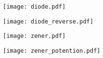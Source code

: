 \documentclass[11pt,dvipdfmx]{jarticle}
\begin{document}
\begin{figure}
  \centering
  \texttt{[image: diode.pdf]}
\end{figure}

\begin{figure}
  \centering
  \texttt{[image: diode\_reverse.pdf]}
\end{figure}

\begin{figure}
  \centering
  \texttt{[image: zener.pdf]}
\end{figure}

\begin{figure}
  \centering
  \texttt{[image: zener\_potention.pdf]}
\end{figure}
\end{document}
